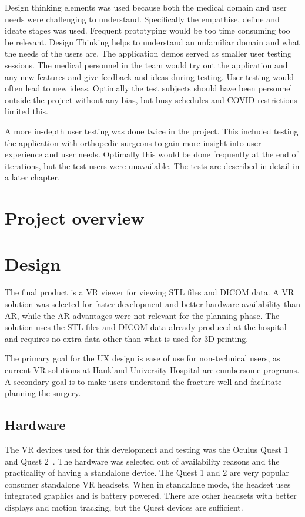 \documentclass[a4paper]{report}
\begin{document}
Design thinking elements was used because both the medical domain and user needs were challenging to understand. Specifically the empathise, define and ideate stages was used. Frequent prototyping would be too time consuming too be relevant. Design Thinking helps to understand an unfamiliar domain and what the needs of the users are.
The application demos served as smaller user testing sessions. The medical personnel in the team would try out the application and any new features and give feedback and ideas during testing. User testing would often lead to new ideas. Optimally the test subjects should have been personnel outside the project without any bias, but busy schedules and COVID restrictions limited this.

A more in-depth user testing was done twice in the project. This included testing the application with orthopedic surgeons to gain more insight into user experience and user needs. Optimally this would be done frequently at the end of iterations, but the test users were unavailable. The tests are described in detail in a later chapter.

\section{Project overview}\label{CodeStructure}

\section{Design}


The final product is a VR viewer for viewing STL files and DICOM data. A VR solution was selected for faster development and better hardware availability than AR, while the AR advantages were not relevant for the planning phase.
The solution uses the STL files and DICOM data already produced at the hospital and requires no extra data other than what is used for 3D printing.

The primary goal for the UX design is ease of use for non-technical users, as current VR solutions at Haukland University Hospital are cumbersome programs.
A secondary goal is to make users understand the fracture well and facilitate planning the surgery.

\subsection{Hardware}
The VR devices used for this development and testing was the Oculus Quest 1 and Quest 2~\cite{noauthor_oculus_nodate}. The hardware was selected out of availability reasons and the practicality of having a standalone device.
The Quest 1 and 2 are very popular consumer standalone VR headsets. When in standalone mode, the headset uses integrated graphics and is battery powered.
There are other headsets with better displays and motion tracking, but the Quest devices are sufficient.
\end{document}
